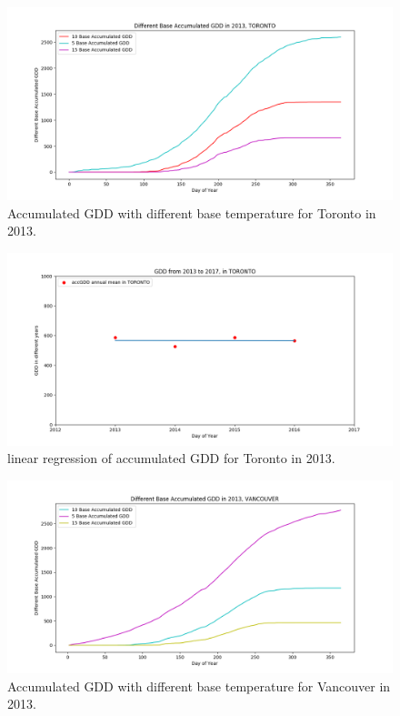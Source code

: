 \documentclass[12pt]{article}
\begin{document}
\begin{center}
\begin{figure}[H]
\includegraphics[width=5.25in]{../Plot/TORONTO/accGDD_Base_2013.png}
\caption{Accumulated GDD with different base temperature for Toronto in 2013.}
\label{19}
\end{figure}
\end{center}

\begin{center}
\begin{figure}[H]
\includegraphics[width=5.25in]{../Plot/TORONTO/GDD_LinearRegression_TORONTO.png}
\caption{linear regression of accumulated GDD for Toronto in 2013.}
\label{20}
\end{figure}
\end{center}


\begin{center}
\begin{figure}[H]
\includegraphics[width=5.25in]{../Plot/VANCOUVER/accGDD_Base_2013.png}
\caption{Accumulated GDD with different base temperature for Vancouver in 2013.}
\label{21}
\end{figure}
\end{center}
\end{document}
